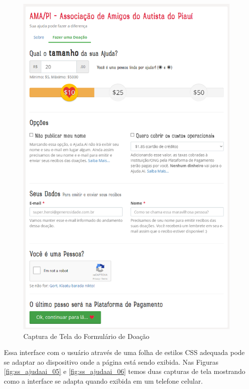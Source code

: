 \begin{figure}[H]
	\caption{\label{fig:ss_ajudaai_04}Captura de Tela do Formulário de Doação}
    \centering
    \includegraphics[scale=0.5]{imagens/screenshot-ajudaai-04.png}
\end{figure}

Essa interface com o usuário através de uma folha de estilos CSS adequada pode se adaptar ao dispositivo onde a página está sendo exibida. Nas Figuras \ref{fig:ss_ajudaai_05} e \ref{fig:ss_ajudaai_06} temos duas capturas de tela mostrando como a interface se adapta quando exibida em um telefone celular.

